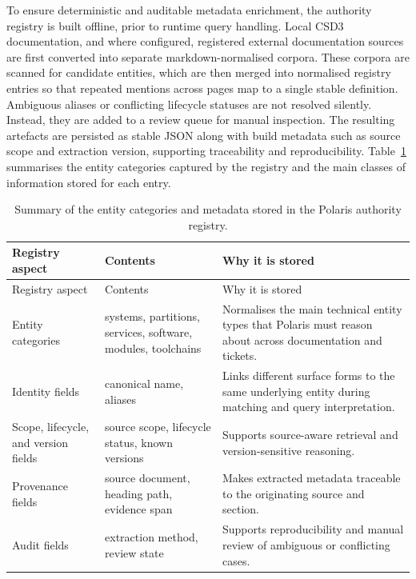 To ensure deterministic and auditable metadata enrichment, the authority registry is built offline, prior to runtime query handling. Local \ac{CSD3} documentation, and where configured, registered external documentation sources are first converted into separate markdown-normalised corpora. These corpora are scanned for candidate entities, which are then merged into normalised registry entries so that repeated mentions across pages map to a single stable definition. Ambiguous aliases or conflicting lifecycle statuses are not resolved silently. Instead, they are added to a review queue for manual inspection. The resulting artefacts are persisted as stable JSON along with build metadata such as source scope and extraction version, supporting traceability and reproducibility. Table~\ref{tab:authority-registry-summary} summarises the entity categories captured by the registry and the main classes of information stored for each entry. 

\begin{longtable}{@{}p{} p{} p{}@{}}
\caption[Summary of the authority registry.]{Summary of the entity categories and metadata stored in the Polaris authority registry.}
\label{tab:authority-registry-summary} \\
\toprule
Registry aspect & Contents & Why it is stored \\
\midrule
\endfirsthead

\toprule
Registry aspect & Contents & Why it is stored \\
\midrule
\endhead

\bottomrule
\endfoot

Entity categories & systems, partitions, services, software, modules, toolchains & Normalises the main technical entity types that Polaris must reason about across documentation and tickets. \\

Identity fields & canonical name, aliases & Links different surface forms to the same underlying entity during matching and query interpretation. \\

Scope, lifecycle, and version fields & source scope, lifecycle status, known versions & Supports source-aware retrieval and version-sensitive reasoning. \\

Provenance fields & source document, heading path, evidence span & Makes extracted metadata traceable to the originating source and section. \\

Audit fields & extraction method, review state & Supports reproducibility and manual review of ambiguous or conflicting cases. \\

\end{longtable}

